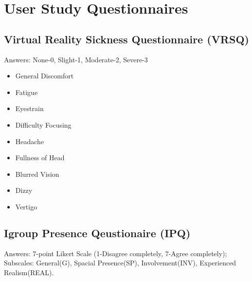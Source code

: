 
%

\chapter{User Study Questionnaires}
\label{app:Questionnaires}

\section{Virtual Reality Sickness Questionnaire (VRSQ)}

Answers: None-0, Slight-1, Moderate-2, Severe-3

\begin{itemize}
    \item General Discomfort
    \item Fatigue
    \item Eyestrain
    \item Difficulty Focusing
    \item Headache
    \item Fullness of Head
    \item Blurred Vision
    \item Dizzy
    \item Vertigo
\end{itemize}

\section{Igroup Presence Qeustionaire (IPQ)}

Answers: 7-point Likert Scale (1-Disagree completely, 7-Agree completely);
Subscales: General(G), Spacial Presence(SP), Involvement(INV), Experienced Realism(REAL).

